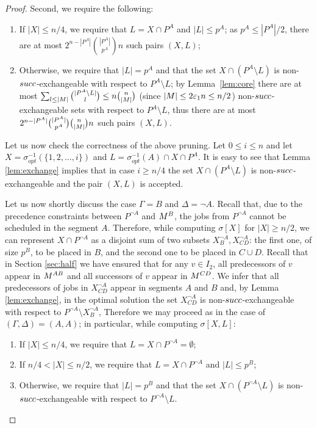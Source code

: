 \documentclass{article}
\theoremstyle{definition}
\begin{document}
\begin{proof}
Second, we require the following:
\begin{enumerate}
\item If $|X| \leq n/4$, we require that $L = X \cap P^A$ and $|L| \leq p^A$; as $p^A\leq |P^A|/2$, there are at most $2^{n-|P^A|} \binom{|P^A|}{p^A} n$ such pairs $(X,L)$;
\item Otherwise, we require that $|L| = p^A$ and that the set $X \cap (P^A \setminus L)$ is non-${succ}$-exchangeable with respect to $P^A \setminus L$;
by Lemma~\ref{lem:core} there are at most 
$\sum_{l \leq |M|} \binom{|P^A \setminus L|}{l} \leq n \binom{n}{|M|}$ (since $|M| \leq 2\varepsilon_1 n \leq n/2$) non-${succ}$-exchangeable sets with respect to $P^A \setminus L$,
thus there are at most $2^{n-|P^A|} \binom{|P^A|}{p^A} \binom{n}{|M|} n$ such pairs $(X,L)$.
\end{enumerate}

Let us now check the correctness of the above pruning. Let $0 \leq i \leq n$ and let $X = \sigma_{opt}^{-1}(\{1,2,\ldots,i\})$ and $L = \sigma_{opt}^{-1}(A) \cap X \cap P^A$.
It is easy to see that Lemma \ref{lem:exchange} implies that in case $i \geq n/4$ the set $X \cap (P^A \setminus L)$ is non-${succ}$-exchangeable and
the pair $(X,L)$ is accepted.

Let us now shortly discuss the case $\Gamma = B$ and $\Delta = \neg A$.
Recall that, due to the precedence constraints between $P^{\neg A}$ and $M^B$,
the jobs from $P^{\neg A}$ cannot be scheduled in the segment $A$. Therefore, while computing $\sigma[X]$ for $|X| \geq n/2$,
we can represent $X \cap P^{\neg A}$ as a disjoint sum of two subsets $X^{\neg A}_B, X^{\neg A}_{CD}$:
the first one, of size $p^B$, to be placed in $B$, and the second one to be placed in $C \cup D$.
Recall that in Section \ref{sec:half} we have ensured that for any $v \in I_2$, all predecessors of $v$ appear
in $M^{AB}$ and all successors of $v$ appear in $M^{CD}$.
We infer that all predecessors of jobs in $X^{\neg A}_{CD}$ appear in segments $A$ and $B$
and, by Lemma \ref{lem:exchange}, in the optimal solution the set $X^{\neg A}_{CD}$ is non-${succ}$-exchangeable with respect to $P^{\neg A} \setminus X^{\neg A}_B$,
Therefore we may proceed as in the case of $(\Gamma,\Delta) = (A,A)$; in particular, while computing $\sigma[X,L]$:
\begin{enumerate}
\item If $|X| \leq n/4$, we require that $L = X \cap P^{\neg A} = \emptyset$;
\item If $n/4 < |X| \leq n/2$, we require that $L = X \cap P^{\neg A}$ and $|L| \leq p^B$;
\item Otherwise, we require that $|L| = p^B$ and that the set $X \cap (P^{\neg A} \setminus L)$ is non-${succ}$-exchangeable with respect to $P^{\neg A} \setminus L$.
\end{enumerate}


\end{proof}
\end{document}
